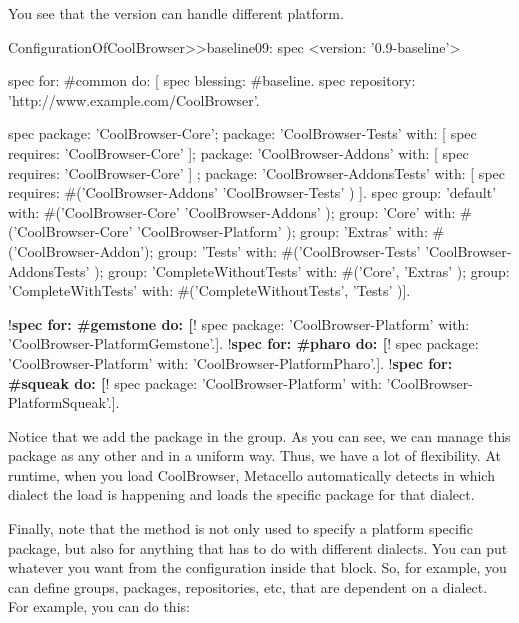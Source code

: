 \documentclass[a4paper,10pt,twoside]{book}
\begin{document}
You see that the version can handle different platform.


\begin{code}{}
ConfigurationOfCoolBrowser>>baseline09: spec 
       <version: '0.9-baseline'>
       
       spec for: #common do: [
              spec blessing: #baseline.
              spec repository: 'http://www.example.com/CoolBrowser'.
              
              spec 
                     package: 'CoolBrowser-Core';
                     package: 'CoolBrowser-Tests' with: [ spec requires: 'CoolBrowser-Core' ];
                     package: 'CoolBrowser-Addons' with: [ spec requires: 'CoolBrowser-Core' ] ;
                     package: 'CoolBrowser-AddonsTests' with: [ 
                            spec requires: #('CoolBrowser-Addons' 'CoolBrowser-Tests' ) ].
              spec 
                     group: 'default' with: #('CoolBrowser-Core' 'CoolBrowser-Addons' );
                     group: 'Core' with: #('CoolBrowser-Core' 'CoolBrowser-Platform' );
                     group: 'Extras' with: #('CoolBrowser-Addon');
                     group: 'Tests' with: #('CoolBrowser-Tests' 'CoolBrowser-AddonsTests' );
                     group: 'CompleteWithoutTests' with: #('Core', 'Extras' );
                     group: 'CompleteWithTests' with: #('CompleteWithoutTests', 'Tests' )].
                     
       !\textbf{spec for: \#gemstone do: [}!
              spec package: 'CoolBrowser-Platform' with: 'CoolBrowser-PlatformGemstone'.].
       !\textbf{spec for: \#pharo do: [}!
              spec package: 'CoolBrowser-Platform' with: 'CoolBrowser-PlatformPharo'.].
       !\textbf{spec for: \#squeak do: [}!
              spec package: 'CoolBrowser-Platform' with: 'CoolBrowser-PlatformSqueak'.].
\end{code}

Notice that we add the package  in the  group. As you can see, we can manage this package as any other and in a uniform way. Thus, we have a lot of flexibility. At runtime, when you load CoolBrowser, Metacello automatically detects in which dialect the load is happening and loads the specific package for that dialect.         

Finally, note that the method  is not only used to specify a platform specific package, but also for anything that has to do with different dialects. You can put whatever you want from the configuration inside that block. So, for example, you can define groups, packages, repositories, etc, that are dependent on a dialect. For example, you can do this:
\end{document}
